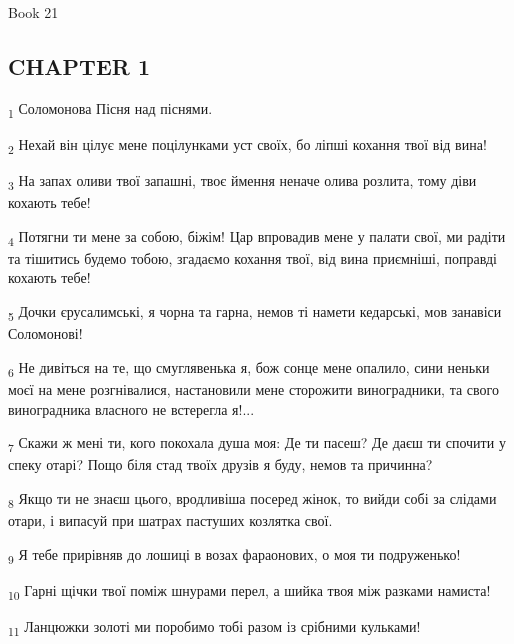 Book 21
\subsection{CHAPTER 1}
\begin{tcolorbox}
\textsubscript{1} Соломонова Пісня над піснями.
\end{tcolorbox}
\begin{tcolorbox}
\textsubscript{2} Нехай він цілує мене поцілунками уст своїх, бо ліпші кохання твої від вина!
\end{tcolorbox}
\begin{tcolorbox}
\textsubscript{3} На запах оливи твої запашні, твоє ймення неначе олива розлита, тому діви кохають тебе!
\end{tcolorbox}
\begin{tcolorbox}
\textsubscript{4} Потягни ти мене за собою, біжім! Цар впровадив мене у палати свої, ми радіти та тішитись будемо тобою, згадаємо кохання твої, від вина приємніші, поправді кохають тебе!
\end{tcolorbox}
\begin{tcolorbox}
\textsubscript{5} Дочки єрусалимські, я чорна та гарна, немов ті намети кедарські, мов занавіси Соломонові!
\end{tcolorbox}
\begin{tcolorbox}
\textsubscript{6} Не дивіться на те, що смуглявенька я, бож сонце мене опалило, сини неньки моєї на мене розгнівалися, настановили мене сторожити виноградники, та свого виноградника власного не встерегла я!...
\end{tcolorbox}
\begin{tcolorbox}
\textsubscript{7} Скажи ж мені ти, кого покохала душа моя: Де ти пасеш? Де даєш ти спочити у спеку отарі? Пощо біля стад твоїх друзів я буду, немов та причинна?
\end{tcolorbox}
\begin{tcolorbox}
\textsubscript{8} Якщо ти не знаєш цього, вродливіша посеред жінок, то вийди собі за слідами отари, і випасуй при шатрах пастуших козлятка свої.
\end{tcolorbox}
\begin{tcolorbox}
\textsubscript{9} Я тебе прирівняв до лошиці в возах фараонових, о моя ти подруженько!
\end{tcolorbox}
\begin{tcolorbox}
\textsubscript{10} Гарні щічки твої поміж шнурами перел, а шийка твоя між разками намиста!
\end{tcolorbox}
\begin{tcolorbox}
\textsubscript{11} Ланцюжки золоті ми поробимо тобі разом із срібними кульками!
\end{tcolorbox}
